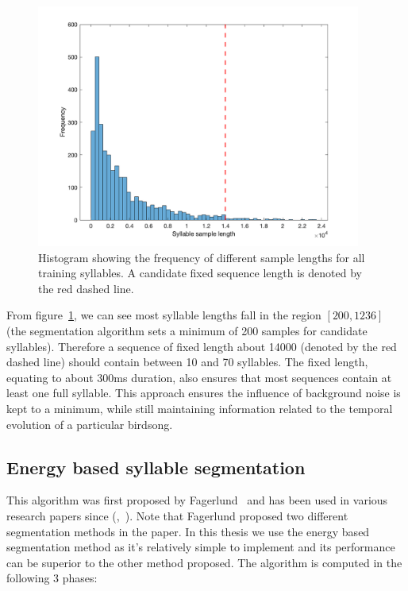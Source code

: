 \begin{figure}[ht]
  \centering
  \includegraphics[width=0.95\textwidth]{figures/syllable_sample_length.png}
  \caption{Histogram showing the frequency of different sample lengths for all
  training syllables. A candidate fixed sequence length is denoted by the red
dashed line.}\label{fig:syllable_sample_lengths}
\end{figure}

From figure~\ref{fig:syllable_sample_lengths}, we can see most syllable lengths
fall in the region $\left[ 200, 1236 \right]$ (the segmentation algorithm sets a
minimum of 200 samples for candidate syllables). Therefore a sequence of fixed
length about 14000 (denoted by the red dashed line) should contain between 10
and 70 syllables. The fixed length, equating to about 300ms duration, also
ensures that most sequences contain at least one full syllable. This approach
ensures the influence of background noise is kept to a minimum, while still
maintaining information related to the temporal evolution of a particular
birdsong.

\subsection{Energy based syllable segmentation}\label{ssec:syllable_seg}

This algorithm was first proposed by Fagerlund~\cite{fagerlund2004automatic}
and has been used in various research papers since
(\cite{somervuo2006parametric},~\cite{ramashini2022robust}). Note that Fagerlund
proposed two different segmentation methods in the paper. In this thesis we use
the energy based segmentation method as it's relatively
simple to implement and its performance can be superior to the other method
proposed. The algorithm is computed in the following 3 phases:

